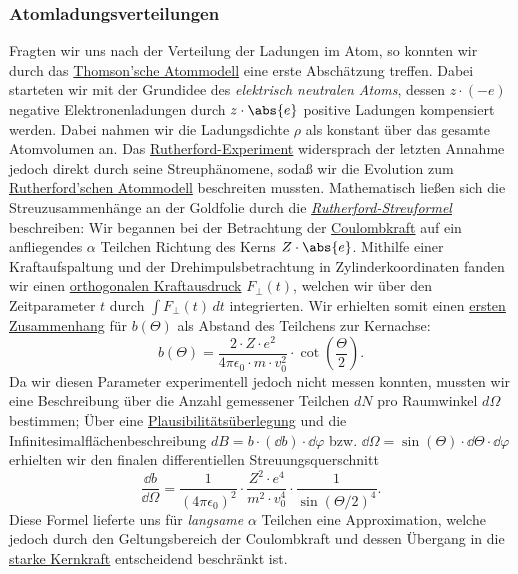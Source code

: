 \documentclass{subfiles}
\begin{document}
    \subsubsection*{Atomladungsverteilungen}\label{Ub:AtomEigenschaften.iii}
        Fragten wir uns nach der Verteilung der Ladungen im Atom, so konnten wir durch das \hyperref[Ub:ThomsonAtom]{Thomson'sche Atommodell} eine erste Abschätzung treffen. Dabei starteten wir mit der Grundidee des \emph{elektrisch neutralen Atoms}, dessen $z\cdot (-e)$ negative Elektronenladungen durch $z\cdot\abs{e}$ positive Ladungen kompensiert werden. Dabei nahmen wir die Ladungsdichte $\rho$ als konstant über das gesamte Atomvolumen an. Das \hyperref[Ub:RutherfordExp]{Rutherford-Experiment} widersprach der letzten Annahme jedoch direkt durch seine Streuphänomene, sodaß wir die Evolution zum \hyperref[Ub:RutherfordModell]{Rutherford'schen Atommodell} beschreiten mussten. Mathematisch ließen sich die Streuzusammenhänge an der Goldfolie durch die \hyperref[Ub:RutherfordStreuformel]{\emph{Rutherford-Streuformel}} beschreiben: Wir begannen bei der Betrachtung der \hyperref[Ub:CoulombKraftRutherford]{Coulombkraft} auf ein anfliegendes $\alpha$ Teilchen Richtung des Kerns $Z\cdot\abs{e}$. Mithilfe einer Kraftaufspaltung und der Drehimpulsbetrachtung in Zylinderkoordinaten fanden wir einen \hyperref[Ub:OrthKraftRutherford]{orthogonalen Kraftausdruck} $F_\perp(t)$, welchen wir über den Zeitparameter $t$ durch $\int F_\perp(t)\, dt$ integrierten. Wir erhielten somit einen \hyperref[Ub:StreuungBahnabstand]{ersten Zusammenhang} für $b(\Theta)$ als Abstand des Teilchens zur Kernachse:
        \[
            b(\Theta) = \frac{2\cdot Z\cdot e^2}{4\pi\epsilon_0\cdot m\cdot v_0^2}\cdot\cot(\frac{\Theta}{2}).
        \]
        Da wir diesen Parameter experimentell jedoch nicht messen konnten, mussten wir eine Beschreibung über die Anzahl gemessener Teilchen $dN$ pro Raumwinkel $d\Omega$ bestimmen; Über eine \hyperref[Ub:dNRutherford]{Plausibilitätsüberlegung} und die Infinitesimalflächenbeschreibung $dB = b\cdot (\dd b)\cdot \dd\varphi$ bzw. $\dd\Omega = \sin(\Theta)\cdot\dd\Theta\cdot\dd\varphi$ erhielten wir den finalen differentiellen Streuungsquerschnitt
        \[
            \frac{\dd b}{\dd\Omega} = \frac{1}{(4\pi\epsilon_0)^2}\cdot\frac{Z^2\cdot e^4}{m^2\cdot v_0^4}\cdot\frac{1}{\sin(\Theta/2)^4}.
        \]
        Diese Formel lieferte uns für \emph{langsame} $\alpha$ Teilchen eine Approximation, welche jedoch durch den Geltungsbereich der Coulombkraft und dessen Übergang in die \hyperref[Ub:starkeKernkraft]{starke Kernkraft} entscheidend beschränkt ist.
\end{document}
